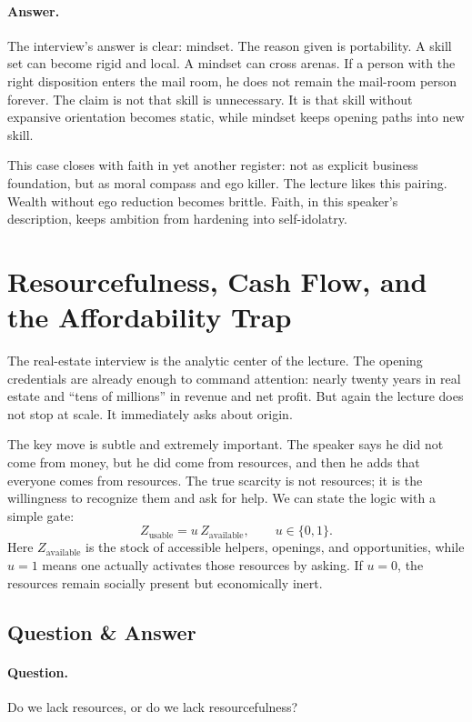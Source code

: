 \paragraph{Answer.} The interview's answer is clear: mindset. The reason given is portability. A skill set can become rigid and local. A mindset can cross arenas. If a person with the right disposition enters the mail room, he does not remain the mail-room person forever. The claim is not that skill is unnecessary. It is that skill without expansive orientation becomes static, while mindset keeps opening paths into new skill.

This case closes with faith in yet another register: not as explicit business foundation, but as moral compass and ego killer. The lecture likes this pairing. Wealth without ego reduction becomes brittle. Faith, in this speaker's description, keeps ambition from hardening into self-idolatry.

\section{Resourcefulness, Cash Flow, and the Affordability Trap}

The real-estate interview is the analytic center of the lecture. The opening credentials are already enough to command attention: nearly twenty years in real estate and ``tens of millions'' in revenue and net profit. But again the lecture does not stop at scale. It immediately asks about origin.

The key move is subtle and extremely important. The speaker says he did not come from money, but he did come from resources, and then he adds that everyone comes from resources. The true scarcity is not resources; it is the willingness to recognize them and ask for help. We can state the logic with a simple gate:
\begin{equation}
Z_{\mathrm{usable}} = u\,Z_{\mathrm{available}},
\qquad
u\in\{0,1\}.
\end{equation}
Here \(Z_{\mathrm{available}}\) is the stock of accessible helpers, openings, and opportunities, while \(u=1\) means one actually activates those resources by asking. If \(u=0\), the resources remain socially present but economically inert.

\subsection{Question \& Answer}

\paragraph{Question.} Do we lack resources, or do we lack resourcefulness?


